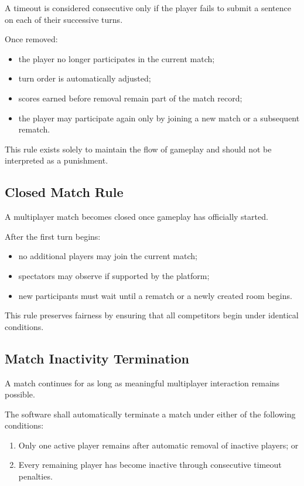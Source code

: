 \documentclass[11pt,a4paper]{article}
\begin{document}
A timeout is considered consecutive only if the player fails to submit a sentence on each of their successive turns.

Once removed:

\begin{itemize}
    \item the player no longer participates in the current match;
    \item turn order is automatically adjusted;
    \item scores earned before removal remain part of the match record;
    \item the player may participate again only by joining a new match or a subsequent rematch.
\end{itemize}

This rule exists solely to maintain the flow of gameplay and should not be interpreted as a punishment.

\subsection{Closed Match Rule}

A multiplayer match becomes closed once gameplay has officially started.

After the first turn begins:

\begin{itemize}
    \item no additional players may join the current match;
    \item spectators may observe if supported by the platform;
    \item new participants must wait until a rematch or a newly created room begins.
\end{itemize}

This rule preserves fairness by ensuring that all competitors begin under identical conditions.


\subsection{Match Inactivity Termination}

A match continues for as long as meaningful multiplayer interaction remains possible.

The software shall automatically terminate a match under either of the following conditions:

\begin{enumerate}
    \item Only one active player remains after automatic removal of inactive players; or
    \item Every remaining player has become inactive through consecutive timeout penalties.
\end{enumerate}
\end{document}
